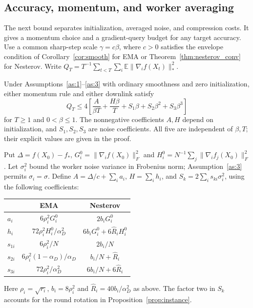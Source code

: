 \begin{codex}
\subsection{Accuracy, momentum, and worker averaging}\label{app:accuracy_tuning}

The next bound separates initialization, averaged noise, and compression
costs. It gives a momentum choice and a gradient-query budget for any target
accuracy. Use a common sharp-step scale $\gamma=c\beta$, where $c>0$
satisfies the envelope condition of Corollary~\ref{cor:smooth} for EMA or
Theorem~\ref{thm:nesterov_conv} for Nesterov. Write
$Q_T=T^{-1}\sum_{t<T}\sum_i\mathbb E\|\nabla_i f(X_t)\|_*^2$.

\begin{proposition}\label{prop:polynomial_rate}
Under Assumptions~\ref{as:1}--\ref{as:3} with ordinary smoothness and zero
initialization, either momentum rule and either downlink satisfy
\begin{equation}\label{eq:polynomial_rate}
 Q_T\le4\left[\frac{A}{\beta T}+\frac{H\beta}{T}
              +S_1\beta+S_2\beta^2+S_3\beta^3\right]
\end{equation}
for $T\ge1$ and $0<\beta\le1$. The nonnegative coefficients $A,H$ depend
on initialization, and $S_1,S_2,S_3$ are noise coefficients. All five are
independent of $\beta,T$; their explicit values are given in the proof.
\end{proposition}
\begin{paperproof}
Put
$\Delta=f(X_0)-f_*$,
$G_i^0=\|\nabla_i f(X_0)\|_F^2$ and
$H_i^0=N^{-1}\sum_j\|\nabla_i f_j(X_0)\|_F^2$.
Let $\sigma_i^2$ bound the worker noise variance in Frobenius norm;
Assumption~\ref{as:3} permits $\sigma_i=\sigma$.
Define $A=\Delta/c+\sum_i a_i$, $H=\sum_i h_i$, and
$S_k=2\sum_i s_{ki}\sigma_i^2$, using the following coefficients:
\begin{center}
\begin{tabular}{@{}lcc@{}}
\toprule
 & EMA & Nesterov \\
\midrule
$a_i$ & $6\rho_i^2G_i^0$ & $2b_iG_i^0$ \\
$h_i$ & $72\rho_i^2H_i^0/\alpha_D^2$
      & $6b_iG_i^0+6\widehat R_iH_i^0$ \\
$s_{1i}$ & $6\rho_i^2/N$ & $2b_i/N$ \\
$s_{2i}$ & $6\rho_i^2(1-\alpha_D)/\alpha_D$
        & $b_i/N+\widehat R_i$ \\
$s_{3i}$ & $72\rho_i^2/\alpha_D^2$
        & $6b_i/N+6\widehat R_i$ \\
\bottomrule
\end{tabular}
\end{center}
Here $\rho_i=\sqrt{r_i}$, $b_i=8\rho_i^2$ and
$\widehat R_i=40b_i/\alpha_D^2$ as above. The factor two in $S_k$
accounts for the round rotation in Proposition~\ref{prop:instance}.


\end{paperproof}
\end{codex}
